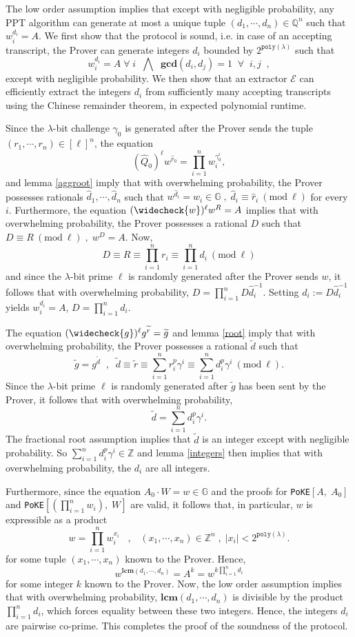\documentclass[11pt, lettersize, notitlepage, leqno, footskip=0.6cm]{article}
\newcommand{\bz}{\mathbb Z}
\newcommand{\bq}{\mathbb Q}
\newcommand{\pl}{\prod\limits}
\newcommand{\slim}{\sum\limits}
\newcommand{\ttt}{\texttt}
\newcommand{\bG}{\mathbb{G}}
\newcommand{\wti}{\widetilde}
\newcommand{\mc}{\mathcal}
\newcommand{\mbf}{\mathbf}
\newcommand{\lam}{\lambda}
\newcommand{\what}{\widehat}
\newcommand{\weck}{\widecheck}
\newcommand{\vs}{\vspace{-0.15cm}}
\newcommand{\op}{overwhelming probability}
\newcommand{\np}{negligible probability}
\newcommand{\Mod}[1]{\ (\mathrm{mod}\ #1)}
\newcommand{\LCM}{\mbf{lcm}}
\newcommand{\GCD}{\mbf{gcd}}
\newcommand{\E}{\mc{E}}
\numberwithin{equation}{section}
\begin{document}
\begin{prf} The low order assumption implies that except with \np, any PPT algorithm can generate at most a unique tuple $(d_1,\cdots,d_n)\in \bq^n$ such that $w_i^{d_i} = A$. We first show that the protocol is sound, i.e. in case of an accepting transcript, the Prover can generate integers $d_i$ bounded by $2^{\ttt{poly}(\lam)}$ such that \vs $$w_i^{d_i} = A\;\forall\; i\;\;\bigwedge\;\;\GCD(d_i,d_j) = 1\;\;\forall\;\; i,j\;\;, $$ except with \np. We then show that an extractor $\E$ can efficiently extract the integers $d_i$ from sufficiently many accepting transcripts using the Chinese remainder theorem, in expected polynomial runtime.

Since the $\lam$-bit challenge $\gamma_{0}$ is generated after the Prover sends the tuple $(r_1,\cdots,r_n)\in[\ell]^n$, the equation \vs $$(\what{Q}_0)^{\ell}w^{\what{r}_0} = \pl_{i=1}^n w_i^{\gamma_{0}^i}, $$ and lemma \ref{aggroot} imply that with \op, the Prover possesses rationals $\what{d}_1,\cdots,\what{d}_n$ such that $w^{\what{d}_i} = w_i\in \bG\;,\;\what{d}_i\equiv \what{r}_i\Mod{\ell}$ for every $i$. Furthermore, the equation $(\weck{w})^{\ell}w^R = A$ implies that with \op, the Prover possesses a rational $D$ such that $D\equiv R\Mod{\ell}\;,\;w^{D} =A$. Now, \vs $$D\equiv R\equiv \pl_{i=1}^n r_i \equiv \pl_{i=1}^n d_i\Mod{\ell}$$ and since the $\lam$-bit prime $\ell$ is randomly generated after the Prover sends $w$, it follows that with \op, $D = \pl_{i=1}^n D\what{d}_i^{-1}$. Setting $d_i:= D\what{d}_i^{-1}$ yields $w_i^{d_i} = A$, $ D = \pl_{i=1}^n d_i.$  

The equation $(\weck{g})^{\ell}g^{\wti{r}}=\wti{g}$ and lemma \ref{root} imply that with \op, the Prover possesses a rational $\wti{d}$ such that \vs $$\wti{g} = g^{\wti{d}}\;\;,\;\; \wti{d}\equiv \wti{r}\equiv\slim_{i=1}^n r_i^p\gamma^i\equiv \slim_{i=1}^n d_i^p\gamma^i \Mod{\ell}.$$ Since the $\lam$-bit prime $\ell$ is randomly generated after $\wti{g}$ has been sent by the Prover, it follows that with \op, \vs $$\wti{d} = \slim_{i=1}^n d_i^p\gamma^i.$$ The fractional root assumption implies that $\wti{d}$ is an integer except with \np. So $\slim_{i=1}^n d_i^p\gamma^i\in \bz$ and lemma \ref{integers} then implies that with \op, the $d_i$ are all integers. 

Furthermore, since the equation $A_0\cdot W = w \in \bG$ and the proofs for \verb|PoKE|$[A,\;A_0]$ and \verb|PoKE|$[(\pl_{i=1}^n w_i),\; W]$ are valid, it follows that, in particular, $w$ is expressible as a product \vs $$w =\pl_{i=1}^n w_i^{x_i}\;\;\;,\;\;\;(x_1,\cdots,x_n)\in\bz^n \;,\;|x_i|< 2^{\ttt{poly}(\lam)}.$$ for some tuple $(x_1,\cdots,x_n)$ known to the Prover. Hence, \vs $$w^{\LCM(d_1,\cdots,d_n)} = A^k = w^{k\pl_{i=1}^n d_i}$$ for some integer $k$ known to the Prover. Now, the low order assumption implies that with \op, $\LCM(d_1,\cdots,d_n)$ is divisible by the product $\prod_{i=1}^n d_i$, which forces equality between these two integers. Hence, the integers $d_i$ are pairwise co-prime. This completes the proof of the soundness of the protocol.


\end{prf}
\end{document}
